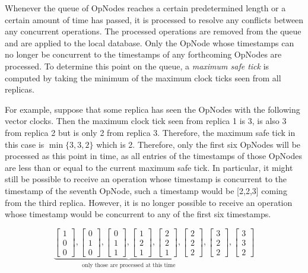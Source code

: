 \documentclass[sigconf,nonacm,10pt]{acmart}
\begin{document}
Whenever the queue of OpNodes reaches a certain predetermined length or a certain amount of time has passed, it is processed to resolve any conflicts between any concurrent operations. The processed operations are removed from the queue and are applied to the local database. Only the OpNode whose timestamps can no longer be concurrent to the timestamps of any forthcoming OpNodes are processed. To determine this point on the queue, a \emph{maximum safe tick} is computed by taking the minimum of the maximum clock ticks seen from all replicas. 

For example, suppose that some replica has seen the OpNodes with the following vector clocks. Then the maximum clock tick seen from replica 1 is 3, is also 3 from replica 2 but is only 2 from replica 3. Therefore, the maximum safe tick in this case is $\min\{3,3,2\}$ which is 2. Therefore, only the first six OpNodes will be processed as this point in time, as all entries of the timestamps of those OpNodes are less than or equal to the current maximum safe tick. In particular, it might still be possible to receive an operation whose timestamp is concurrent to the timestamp of the seventh OpNode, such a timestamp would be [2,2,3] coming from the third replica. However, it is no longer possible to receive an operation whose timestamp would be concurrent to any of the first six timestamps.

$$ \underbrace{\begin{bmatrix} 1\\0\\0 \end{bmatrix},
\begin{bmatrix} 0\\1\\0 \end{bmatrix},
\begin{bmatrix} 0\\1\\1 \end{bmatrix},
\begin{bmatrix} 1\\2\\1 \end{bmatrix},
\begin{bmatrix} 2\\2\\1 \end{bmatrix},
\begin{bmatrix} 2\\2\\2 \end{bmatrix}}_{\text{only those are processed at this time}}, 
\begin{bmatrix} 3\\2\\2 \end{bmatrix},
\begin{bmatrix} 3\\3\\2 \end{bmatrix}$$
\end{document}

